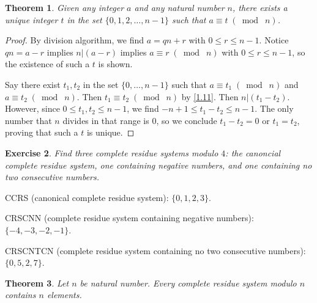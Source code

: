 \documentclass{article}
\newtheorem{thm}{Theorem}[section]
\newtheorem{ex}[thm]{Exercise}
\numberwithin{equation}{thm}
\providecommand{\gmod}[1]{\; (\bmod \; #1)}
\begin{document}
\setcounter{thm}{13}

\begin{thm} \label{3.14}
  Given any integer $a$ and any natural number $n$, there exists a unique integer $t$ in the set $\{0, 1, 2, \ldots, n-1\}$ such that $a \equiv t \gmod n$.
\end{thm}

\begin{proof}
  By division algorithm, we find $a = qn + r$ with $0 \leq r \leq n-1$. Notice $qn = a-r$ implies $n | (a-r)$ implies $a \equiv r \gmod n$ with $0 \leq r \leq n-1$, so the existence of such a $t$ is shown.

  Say there exist $t_1,t_2$ in the set $\{0,\ldots,n-1\}$ such that $a \equiv t_1 \gmod n$ and $a \equiv t_2 \gmod n$. Then $t_1 \equiv t_2 \gmod n$ by \ref{1.11}. Then $n | (t_1 - t_2)$.
  However, since $0 \leq t_1, t_2 \leq n-1$, we find $-n+1 \leq t_1 - t_2 \leq n-1$. The only number that $n$ divides in that range is $0$, so we conclude $t_1 - t_2 = 0$ or $t_1 = t_2$, proving that such a $t$ is unique.
\end{proof}



\begin{ex} \label{3.15}
  Find three complete residue systems modulo $4$: the canoncial complete residue system, one containing negative numbers, and one containing no two consecutive numbers.
\end{ex}

CCRS (canonical complete residue system): $\{0, 1, 2, 3\}$.

CRSCNN (complete residue system containing negative numbers): $\{-4, -3, -2, -1\}$.

CRSCNTCN (complete residue system containing no two consecutive numbers): $\{0, 5, 2, 7\}$.



\pagebreak



\begin{thm} \label{3.16}
  Let $n$ be natural number. Every complete residue system modulo $n$ contains $n$ elements.
\end{thm}
\end{document}
